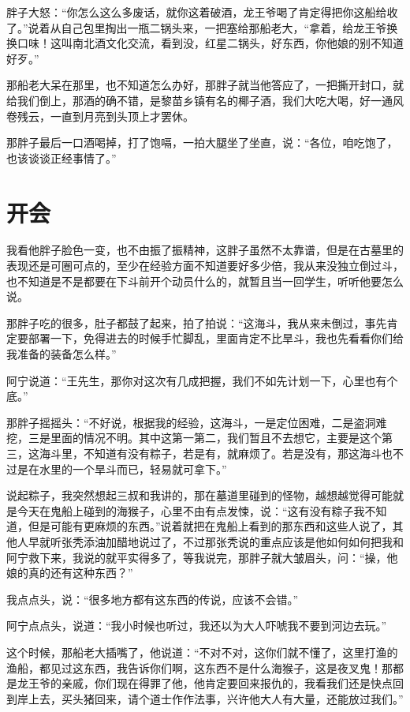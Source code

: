 胖子大怒：“你怎么这么多废话，就你这着破酒，龙王爷喝了肯定得把你这船给收了。”说着从自己包里掏出一瓶二锅头来，一把塞给那船老大，“拿着，给龙王爷换换口味！这叫南北酒文化交流，看到没，红星二锅头，好东西，你他娘的别不知道好歹。”

那船老大呆在那里，也不知道怎么办好，那胖子就当他答应了，一把撕开封口，就给我们倒上，那酒的确不错，是黎苗乡镇有名的椰子酒，我们大吃大喝，好一通风卷残云，一直到月亮到头顶上才罢休。

那胖子最后一口酒喝掉，打了饱嗝，一拍大腿坐了坐直，说：“各位，咱吃饱了，也该谈谈正经事情了。”

\chapter{开会}

我看他胖子脸色一变，也不由振了振精神，这胖子虽然不太靠谱，但是在古墓里的表现还是可圈可点的，至少在经验方面不知道要好多少倍，我从来没独立倒过斗，也不知道是不是都要在下斗前开个动员什么的，就暂且当一回学生，听听他要怎么说。

那胖子吃的很多，肚子都鼓了起来，拍了拍说：“这海斗，我从来未倒过，事先肯定要部署一下，免得进去的时候手忙脚乱，里面肯定不比旱斗，我也先看看你们给我准备的装备怎么样。”

阿宁说道：“王先生，那你对这次有几成把握，我们不如先计划一下，心里也有个底。”

那胖子摇摇头：“不好说，根据我的经验，这海斗，一是定位困难，二是盗洞难挖，三是里面的情况不明。其中这第一第二，我们暂且不去想它，主要是这个第三，这海斗里，不知道有没有粽子，若是有，就麻烦了。若是没有，那这海斗也不过是在水里的一个旱斗而已，轻易就可拿下。”

说起粽子，我突然想起三叔和我讲的，那在墓道里碰到的怪物，越想越觉得可能就是今天在鬼船上碰到的海猴子，心里不由有点发悚，说：“这有没有粽子我不知道，但是可能有更麻烦的东西。”说着就把在鬼船上看到的那东西和这些人说了，其他人早就听张秃添油加醋地说过了，不过那张秃说的重点应该是他如何如何把我和阿宁救下来，我说的就平实得多了，等我说完，那胖子就大皱眉头，问：“操，他娘的真的还有这种东西？”

我点点头，说：“很多地方都有这东西的传说，应该不会错。”

阿宁点点头，说道：“我小时候也听过，我还以为大人吓唬我不要到河边去玩。”

这个时候，那船老大插嘴了，他说道：“不对不对，这你们就不懂了，这里打渔的渔船，都见过这东西，我告诉你们啊，这东西不是什么海猴子，这是夜叉鬼！那都是龙王爷的亲戚，你们现在得罪了他，他肯定要回来报仇的，我看我们还是快点回到岸上去，买头猪回来，请个道士作作法事，兴许他大人有大量，还能放过我们。”

